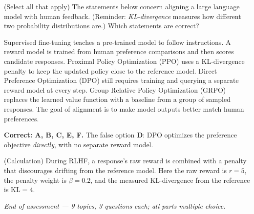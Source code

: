 \documentclass[answers,addpoints]{exam}
\begin{document}
\begin{questions}
\question[3] (Select all that apply) The statements below concern aligning a large
language model with human feedback. (Reminder: \emph{KL-divergence} measures how
different two probability distributions are.) Which statements are correct?
\begin{checkboxes}
  \CorrectChoice Supervised fine-tuning teaches a pre-trained model to follow
        instructions.
  \CorrectChoice A reward model is trained from human preference comparisons and
        then scores candidate responses.
  \CorrectChoice Proximal Policy Optimization (PPO) uses a KL-divergence penalty to
        keep the updated policy close to the reference model.
  \choice Direct Preference Optimization (DPO) still requires training and querying
        a separate reward model at every step.
  \CorrectChoice Group Relative Policy Optimization (GRPO) replaces the learned value
        function with a baseline from a group of sampled responses.
  \CorrectChoice The goal of alignment is to make model outputs better match human
        preferences.
\end{checkboxes}
\begin{solution}
\textbf{Correct: A, B, C, E, F.} The false option \textbf{D}: DPO optimizes the
preference objective \emph{directly}, with no separate reward model.
\end{solution}

\question[5] (Calculation) During RLHF, a response's raw reward is combined with a
penalty that discourages drifting from the reference model. Here the raw reward is
$r=5$, the penalty weight is $\beta=0.2$, and the measured KL-divergence from the
reference is $\mathrm{KL}=4$.

\end{questions}

\vfill
\begin{center}\small\itshape End of assessment --- 9 topics, 3 questions each; all parts multiple choice.\end{center}
\end{document}
